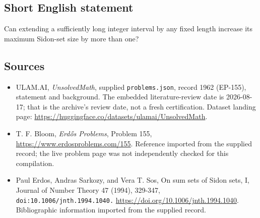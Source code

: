 \documentclass[11pt,a4paper]{article}
\begin{document}
\subsection{Short English statement}

Can extending a sufficiently long integer interval by any fixed length increase its maximum Sidon-set size by more than one?

\subsection{Sources}

{\small

\begin{itemize}

\item[\hypertarget{source:1962:1}{S1}] ULAM.AI, \emph{UnsolvedMath}, supplied \texttt{problems.json}, record 1962 (EP-155), statement and background. The embedded literature-review date is 2026-08-17; that is the archive’s review date, not a fresh certification. Dataset landing page: \url{https://huggingface.co/datasets/ulamai/UnsolvedMath}.

\item[\hypertarget{source:1962:2}{S2}] T. F. Bloom, \emph{Erdős Problems}, Problem 155, \url{https://www.erdosproblems.com/155}. Reference imported from the supplied record; the live problem page was not independently checked for this compilation.

\item[\hypertarget{source:1962:3}{S3}] Paul Erdos, Andras Sarkozy, and Vera T. Sos, On sum sets of Sidon sets, I, Journal of Number Theory 47 (1994), 329-347, \nolinkurl{doi:10.1006/jnth.1994.1040.} \url{https://doi.org/10.1006/jnth.1994.1040}. Bibliographic information imported from the supplied record.

\end{itemize}

}

\label{end:1962}
\end{document}

